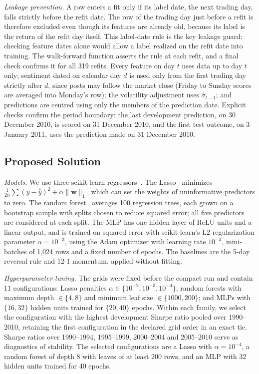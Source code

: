 \documentclass[conference]{IEEEtran}
\begin{document}
\textit{Leakage prevention.} A row enters a fit only if its label date, the next trading day, falls strictly before the refit date. The row of the trading day just before a refit is therefore excluded even though its features are already old, because its label is the return of the refit day itself. This label-date rule is the key leakage guard: checking feature dates alone would allow a label realized on the refit date into training. The walk-forward function asserts the rule at each refit, and a final check confirms it for all 319 refits. Every feature on day $t$ uses data up to day $t$ only; sentiment dated on calendar day $d$ is used only from the first trading day strictly after $d$, since posts may follow the market close (Friday to Sunday scores are averaged into Monday's row); the volatility adjustment uses $\hat\sigma_{t-1}$; and predictions are centred using only the members of the prediction date. Explicit checks confirm the period boundary: the last development prediction, on 30 December 2010, is scored on 31 December 2010, and the first test outcome, on 3 January 2011, uses the prediction made on 31 December 2010.

\subsection{Proposed Solution}
\label{sec:t3_solution}

\textit{Models.} We use three scikit-learn regressors~\cite{sklearn}. The Lasso~\cite{tibshirani1996} minimizes
$\frac{1}{2n}\sum(y-\hat y)^2+\alpha\lVert\mathbf w\rVert_1$,
which can set the weights of uninformative predictors to zero. The random forest~\cite{breiman2001} averages 100 regression trees, each grown on a bootstrap sample with splits chosen to reduce squared error; all five predictors are considered at each split. The MLP has one hidden layer of ReLU units and a linear output, and is trained on squared error with scikit-learn's L2 regularization parameter $\alpha=10^{-3}$, using the Adam optimizer with learning rate $10^{-3}$, mini-batches of 1,024 rows and a fixed number of epochs. The baselines are the 5-day reversal rule and 12-1 momentum, applied without fitting.

\textit{Hyperparameter tuning.} The grids were fixed before the compact run and contain 11 configurations: Lasso penalties $\alpha\in\{10^{-2},10^{-3},10^{-4}\}$; random forests with maximum depth $\in\{4,8\}$ and minimum leaf size $\in\{1000,200\}$; and MLPs with $\{16,32\}$ hidden units trained for $\{20,40\}$ epochs. Within each family, we select the configuration with the highest development Sharpe ratio pooled over 1990--2010, retaining the first configuration in the declared grid order in an exact tie. Sharpe ratios over 1990--1994, 1995--1999, 2000--2004 and 2005--2010 serve as diagnostics of stability. The selected configurations are a Lasso with $\alpha=10^{-4}$, a random forest of depth 8 with leaves of at least 200 rows, and an MLP with 32 hidden units trained for 40 epochs.
\end{document}

